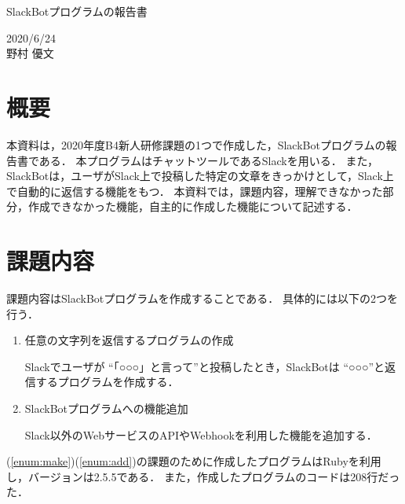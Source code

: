\documentclass[12pt]{jsarticle}
\begin{document}
\begin{center}
{\LARGE SlackBotプログラムの報告書}
\end{center}

\begin{flushright}
  2020/6/24\\
  野村 優文
\end{flushright}
\section{概要}
\label{sec:introduction}
本資料は，2020年度B4新人研修課題の1つで作成した，SlackBotプログラムの報告書である．
本プログラムはチャットツールであるSlack\cite{Slack}を用いる．
また，SlackBotは，ユーザがSlack上で投稿した特定の文章をきっかけとして，Slack上で自動的に返信する機能をもつ．
本資料では，課題内容，理解できなかった部分，作成できなかった機能，自主的に作成した機能について記述する．

\section{課題内容}\label{sec:content}
課題内容はSlackBotプログラムを作成することである．
具体的には以下の2つを行う．

\begin{enumerate}
\item\label{enum:make} 任意の文字列を返信するプログラムの作成

  Slackでユーザが ``「○○○」と言って''と投稿したとき，SlackBotは ``○○○''と返信するプログラムを作成する．
  
\item\label{enum:add} SlackBotプログラムへの機能追加

  Slack以外のWebサービスのAPIやWebhookを利用した機能を追加する．
\end{enumerate}
(\ref{enum:make})(\ref{enum:add})の課題のために作成したプログラムはRubyを利用し，バージョンは2.5.5である．
また，作成したプログラムのコードは208行だった．
\end{document}
